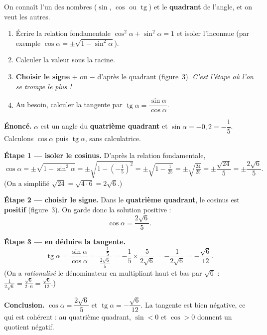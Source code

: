 \documentclass[11pt,a4paper]{article}
\DeclareMathOperator{\tg}{tg}        %
\begin{document}
\begin{methode}
On connaît l'un des nombres ($\sin$, $\cos$ ou $\tg$) et le \textbf{quadrant} de l'angle, et on veut
les autres.
\begin{enumerate}[leftmargin=1.7em,topsep=2pt,itemsep=2pt]
  \item Écrire la relation fondamentale $\cos^2\alpha+\sin^2\alpha=1$ et isoler l'inconnue
        (par exemple $\cos\alpha=\pm\sqrt{1-\sin^2\alpha}$).
  \item Calculer la valeur sous la racine.
  \item \textbf{Choisir le signe} $+$ ou $-$ d'après le quadrant (figure~3). \emph{C'est l'étape
        où l'on se trompe le plus !}
  \item Au besoin, calculer la tangente par $\tg\alpha=\dfrac{\sin\alpha}{\cos\alpha}$.
\end{enumerate}
\end{methode}

\begin{exemple}[un angle du quatrième quadrant avec $\sin\alpha=-0{,}2$]
\textbf{Énoncé.} $\alpha$ est un angle du \textbf{quatrième quadrant} et $\sin\alpha=-0{,}2=-\dfrac15$.
Calculons $\cos\alpha$ puis $\tg\alpha$, sans calculatrice.

\smallskip
\textbf{Étape 1 --- isoler le cosinus.} D'après la relation fondamentale,
\[
\cos\alpha=\pm\sqrt{1-\sin^2\alpha}=\pm\sqrt{1-\left(-\tfrac15\right)^2}
=\pm\sqrt{1-\tfrac{1}{25}}=\pm\sqrt{\tfrac{24}{25}}=\pm\frac{\sqrt{24}}{5}=\pm\frac{2\sqrt6}{5}.
\]
(On a simplifié $\sqrt{24}=\sqrt{4\cdot6}=2\sqrt6$.)

\smallskip
\textbf{Étape 2 --- choisir le signe.} Dans le \textbf{quatrième quadrant}, le cosinus est
\textbf{positif} (figure~3). On garde donc la solution positive :
\[
\cos\alpha=\frac{2\sqrt6}{5}.
\]

\smallskip
\textbf{Étape 3 --- en déduire la tangente.}
\[
\tg\alpha=\frac{\sin\alpha}{\cos\alpha}
=\frac{-\tfrac15}{\ \tfrac{2\sqrt6}{5}\ }
=-\frac15\times\frac{5}{2\sqrt6}
=-\frac{1}{2\sqrt6}
=-\frac{\sqrt6}{12}.
\]
(On a \emph{rationalisé} le dénominateur en multipliant haut et bas par $\sqrt6$ :
$\frac{1}{2\sqrt6}=\frac{\sqrt6}{2\cdot6}=\frac{\sqrt6}{12}$.)

\smallskip
\textbf{Conclusion.} $\cos\alpha=\dfrac{2\sqrt6}{5}$ et $\tg\alpha=-\dfrac{\sqrt6}{12}$. La tangente
est bien négative, ce qui est cohérent : au quatrième quadrant, $\sin<0$ et $\cos>0$ donnent un
quotient négatif.
\end{exemple}
\end{document}
